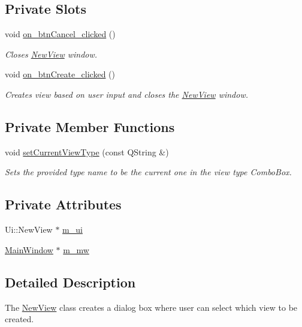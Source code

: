\subsection*{Private Slots}
\begin{DoxyCompactItemize}
\item 
void \hyperlink{classNewView_a1420ad9f114c7a5ff01f55195d7378bd}{on\-\_\-btn\-Cancel\-\_\-clicked} ()
\begin{DoxyCompactList}\small\item\em Closes \hyperlink{classNewView}{New\-View} window. \end{DoxyCompactList}\item 
void \hyperlink{classNewView_a0a34135b4013988f3276bce43782c8ea}{on\-\_\-btn\-Create\-\_\-clicked} ()
\begin{DoxyCompactList}\small\item\em Creates view based on user input and closes the \hyperlink{classNewView}{New\-View} window. \end{DoxyCompactList}\end{DoxyCompactItemize}
\subsection*{Private Member Functions}
\begin{DoxyCompactItemize}
\item 
void \hyperlink{classNewView_aa364531816409ad712b7ea54eba38ee4}{set\-Current\-View\-Type} (const Q\-String \&)
\begin{DoxyCompactList}\small\item\em Sets the provided type name to be the current one in the view type Combo\-Box. \end{DoxyCompactList}\end{DoxyCompactItemize}
\subsection*{Private Attributes}
\begin{DoxyCompactItemize}
\item 
Ui\-::\-New\-View $\ast$ \hyperlink{classNewView_ab8a3d70ca1c0826d69d4411a21f365e0}{m\-\_\-ui}
\item 
\hyperlink{classMainWindow}{Main\-Window} $\ast$ \hyperlink{classNewView_a086dc0337a001800ccd5abaef3f7d815}{m\-\_\-mw}
\end{DoxyCompactItemize}


\subsection{Detailed Description}
The \hyperlink{classNewView}{New\-View} class creates a dialog box where user can select which view to be created. 




